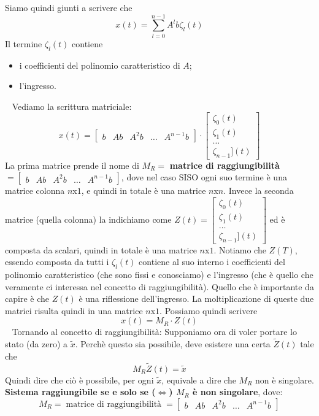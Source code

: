 \newline
Siamo quindi giunti a scrivere che
\[
    x(t) = \sum_{l=0}^{n-1} A^l b \zeta_l(t)
\]
Il termine $\zeta_l(t)$ contiene
\begin{itemize}
    \item i coefficienti del polinomio caratteristico di $A$;
    \item l'ingresso.
\end{itemize}
\ \newline
Vediamo la scrittura matriciale:
\[
    x(t) = \left[\begin{matrix}
        b & Ab & A^2 b & \dots & A^{n-1}b
    \end{matrix}\right] \cdot  \left[\begin{matrix}
        \zeta_0(t)\\
        \zeta_1(t)\\
        \dots\\
        \zeta_{n-1}](t)
    \end{matrix}\right]
\]
La prima matrice prende il nome di $M_R=$ \textbf{matrice di raggiungibilità} $=\left[\begin{matrix}
    b & Ab & A^2 b & \dots & A^{n-1}b
\end{matrix}\right] $, dove nel caso SISO ogni suo termine è una matrice colonna $n$x$1$, e quindi in totale è una matrice $n$x$n$.\newline
Invece la seconda matrice (quella colonna) la indichiamo come $Z(t) = \left[\begin{matrix}
    \zeta_0(t)\\
    \zeta_1(t)\\
    \dots\\
    \zeta_{n-1}](t)
\end{matrix}\right]$ ed è composta da scalari, quindi in totale è una matrice $n$x$1$. Notiamo che $Z(T)$, essendo composta da tutti i $\zeta_l(t)$ contiene al suo interno i coefficienti del polinomio caratteristico (che sono fissi e conosciamo) e l'ingresso (che è quello che veramente ci interessa nel concetto di raggiungibilità). Quello che è importante da capire è che $Z(t)$ è una riflessione dell'ingresso.\newline
La moltiplicazione di queste due matrici risulta quindi in una matrice $n$x$1$.\newline
Possiamo quindi scrivere 
\[
    x(t) = M_R \cdot Z(t)
\]
\ \newline
Tornando al concetto di raggiungibilità:\newline
Supponiamo ora di voler portare lo stato (da zero) a $\tilde{x}$. Perchè questo sia possibile, deve esistere una certa $\tilde{Z}(t)$ tale che 
\[
    M_R \tilde{Z}(t) = \tilde{x}
\]
Quindi dire che ciò è possibile, per ogni $\tilde{x}$, equivale a dire che $M_R$ non è singolare.\newline
\newline
\textbf{Sistema raggiungibile se e solo se ($\Leftrightarrow$) $M_R$ è non singolare}, dove:
\[
    M_R= \;\text{matrice di raggiungibilità}\; =\left[\begin{matrix}
        b & Ab & A^2 b & \dots & A^{n-1}b
    \end{matrix}\right]
\]
